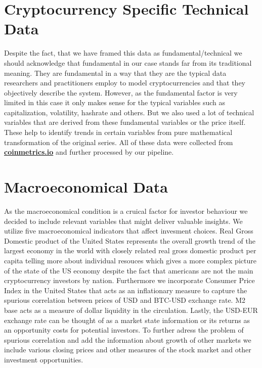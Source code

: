 \section{Cryptocurrency Specific Technical Data}

Despite the fact, that we have framed this data as fundamental/technical 
we should acknowledge that fundamental in our case stands far from its 
traditional meaning. They are fundamental in a way that they 
are the typical data researchers and practitioners employ to model cryptocurrencies
and that they objectively describe the system.
However, as the fundamental factor is very limited in this case it only makes sense
for the typical variables such as capitalization, volatility, hashrate and others.
But we also used a lot of technical variables that are derived from these fundamental
variables or the price itself. These help to identify trends in certain 
variables from pure mathematical transformation of the original series. 
All of these data were collected from \textbf{\href{https://coinmetrics.io/}{coinmetrics.io}}
and further processed by our pipeline.




\section{Macroeconomical Data}

As the macroeconomical condition is a cruical factor for investor behaviour 
we decided to include relevant variables that might deliver valuable
insights. We utilize five macroeconomical indicators that affect invesment choices.
Real Gross Domestic product of the United States represents the overall
growth trend of the largest economy in the world with closely related real
gross domestic product per capita telling more about individual resouces which
gives a more complex picture of the state of the US economy despite the 
fact that americans are not the main cryptocurrency investors by nation.
Furthermore we incorporate Consumer Price Index in the United States that
acts as an inflationary measure to capture the spurious correlation between 
prices of USD and BTC-USD exchange rate. M2 base acts as a measure
of dollar liquidity in the circulation. Lastly, the USD-EUR exchange rate
can be thought of as a market state information or its returns as an 
opportunity costs for potential investors. To further adress the problem of spurious
correlation and add the information about growth of other markets we include
various closing prices and other measures of the stock market and other 
investment opportunities. 



